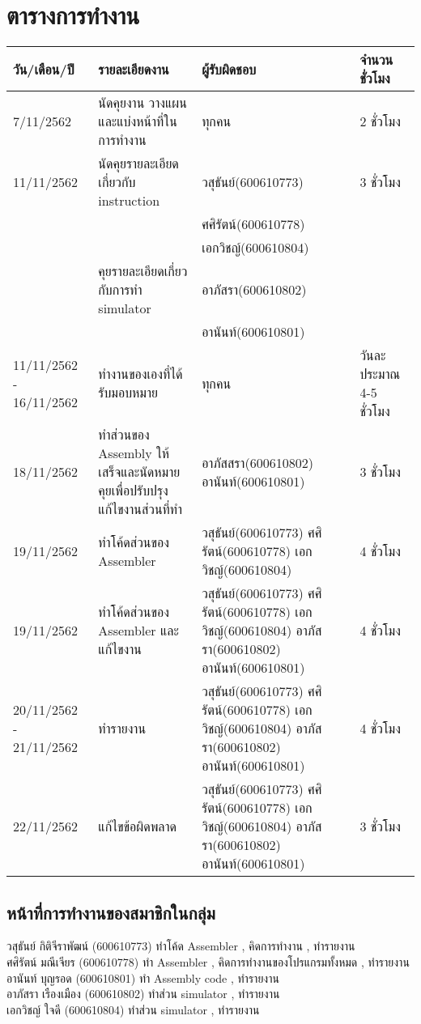 \documentclass[14pt]{article}
\begin{document}
\section{ตารางการทำงาน}

\begin{tabular}{ |p{2cm}|p{6cm}|p{3cm}|p{2cm}|  }
\hline
วัน/เดือน/ปี & รายละเอียดงาน &ผู้รับผิดชอบ & จำนวนชั่วโมง\\
\hline
7/11/2562 & นัดคุยงาน วางแผน และแบ่งหน้าที่ในการทำงาน  & ทุกคน & 2 ชั่วโมง\\
\hline
11/11/2562 & นัดคุยรายละเอียดเกี่ยวกับ instruction  & วสุธันย์(600610773) &3 ชั่วโมง\\ &&ศศิรัตน์(600610778) &\\ &&เอกวิชญ์(600610804) & \\
          & คุยรายละเอียดเกี่ยวกับการทำ simulator & อาภัสรา(600610802)  &\\ && อานันท์(600610801) & \\
\hline
11/11/2562 - 16/11/2562 &ทำงานของเองที่ได้รับมอบหมาย & ทุกคน & วันละประมาณ 4-5 ชั่วโมง\\
\hline
18/11/2562 &ทำส่วนของ Assembly ให้เสร็จและนัดหมายคุยเพื่อปรับปรุงแก้ไขงานส่วนที่ทำ & อาภัสสรา(600610802)        อานันท์(600610801) & 3 ชั่วโมง\\
\hline
19/11/2562 &ทำโค้ดส่วนของ Assembler & วสุธันย์(600610773)    ศศิรัตน์(600610778) เอกวิชญ์(600610804) & 4 ชั่วโมง\\
\hline
19/11/2562 &ทำโค้ดส่วนของ Assembler และแก้ไขงาน  & วสุธันย์(600610773)    ศศิรัตน์(600610778) เอกวิชญ์(600610804)  อาภัสรา(600610802) อานันท์(600610801) & 4 ชั่วโมง\\
\hline
20/11/2562 - 21/11/2562 &ทำรายงาน & วสุธันย์(600610773)    ศศิรัตน์(600610778) เอกวิชญ์(600610804)  อาภัสรา(600610802) อานันท์(600610801) & 4 ชั่วโมง\\
\hline
22/11/2562 &แก้ไขข้อผิดพลาด& วสุธันย์(600610773)    ศศิรัตน์(600610778) เอกวิชญ์(600610804)  อาภัสรา(600610802) อานันท์(600610801) & 3 ชั่วโมง\\
\hline
\end{tabular}
\subsection{หน้าที่การทำงานของสมาชิกในกลุ่ม}
วสุธันย์ กิติจีราพัฒน์ (600610773) ทำโค้ด Assembler , คิดการทำงาน , ทำรายงาน\\
ศศิรัตน์ มณีเจียร (600610778) ทำ Assembler , คิดการทำงานของโปรแกรมทั้งหมด , ทำรายงาน\\
อานันท์ บุญรอด (600610801) ทำ Assembly code , ทำรายงาน\\
อาภัสรา เรืองเมือง (600610802) ทำส่วน simulator , ทำรายงาน\\
เอกวิชญ์ ใจดี (600610804) ทำส่วน simulator , ทำรายงาน\\
\end{document}
